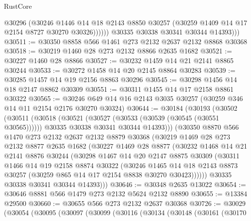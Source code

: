\begin{lexlean}{RustCore}
\begin{coremodule}
                  @30296
                  (@30246
                    @1446
                    @14
                    @18
                    @2143
                    @8850
                    @30257
                    (@30259 @1409 @14 @17 @2154 @8727 @30270 @30326))))))
          @30335
          @30338
          @30341
          @30344
          @14393)))
@30511 := @30350 @8858 @566 @1461 @273 @2132 @2637 @2132 @8868 @30368
@30518 := @30219 @1460 @28 @273 @2132 @8866 @2635 @1682
@30521 := @30227 @1460 @28 @8866
@30527 := @30232 @1459 @14 @21 @2141 @8865 @30244
@30533 := @30272 @1458 @14 @20 @2145 @8864 @30283
@30539 := @30285 @1457 @14 @19 @2156 @8863 @30296
@30545 := @30298 @1456 @14 @18 @2147 @8862 @30309
@30551 := @30311 @1455 @14 @17 @2158 @8861 @30322
@30565 := @30246 @649 @14 @16 @2143 @3035 @30257 (@30259 @346 @14 @11 @2154 @2176 @30270 @30324)
@30644 := @30184
    (@30193
      (@30502
        (@30511
          (@30518
            (@30521 (@30527 (@30533 (@30539 (@30545 (@30551 @30565))))))
            @30335
            @30338
            @30341
            @30344
            @14393)))
      (@30350
        @8870
        @566
        @1470
        @273
        @2132
        @2637
        @2132
        @8879
        @30368
        (@30219
          @1469
          @28
          @273
          @2132
          @8877
          @2635
          @1682
          (@30227
            @1469
            @28
            @8877
            (@30232
              @1468
              @14
              @21
              @2141
              @8876
              @30244
              (@30298
                @1467
                @14
                @20
                @2147
                @8875
                @30309
                (@30311
                  @1466
                  @14
                  @19
                  @2158
                  @8874
                  @30322
                  (@30246
                    @1465
                    @14
                    @18
                    @2143
                    @8873
                    @30257
                    (@30259 @865 @14 @17 @2154 @8838 @30270 @30423))))))
          @30335
          @30338
          @30341
          @30344
          @14393)))
@30646 := @30348 @2635 @13022
@30654 := @30646 @8881 @566 @1479 @273 @2132 @5624 @2132 @8890
@30655 := @13384 @29500
@30660 := @30655 @566 @273 @2132 @2637 @30368
@30726 := @30029
    (@30054
      (@30095
        (@30097
          (@30099
            (@30116
              (@30134
                (@30148
                  (@30161
                    (@30170

\end{coremodule}
\end{lexlean}
